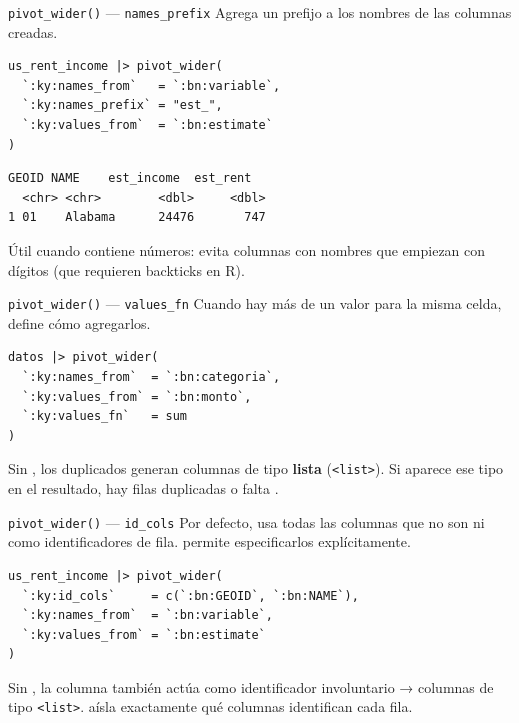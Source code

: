 \documentclass[8pt]{beamer}
\begin{document}
	\begin{frame}[fragile]{\texttt{pivot\_wider()} — \texttt{names\_prefix}}
		Agrega un prefijo a los nombres de las columnas creadas.

		\begin{lstlisting}[style=RScript]
us_rent_income |> pivot_wider(
  `:ky:names_from`   = `:bn:variable`,
  `:ky:names_prefix` = "est_",
  `:ky:values_from`  = `:bn:estimate`
)
\end{lstlisting}
		\begin{lstlisting}[style=RConsole]
  GEOID NAME    est_income  est_rent
  <chr> <chr>        <dbl>     <dbl>
1 01    Alabama      24476       747
\end{lstlisting}

		\begin{block}{}
			Útil cuando  contiene números: evita columnas con nombres que empiezan con dígitos (que requieren backticks en R).
		\end{block}
	\end{frame}

	\begin{frame}[fragile]{\texttt{pivot\_wider()} — \texttt{values\_fn}}
		Cuando hay más de un valor para la misma celda,  define cómo agregarlos.

		\begin{lstlisting}[style=RScript]
datos |> pivot_wider(
  `:ky:names_from`  = `:bn:categoria`,
  `:ky:values_from` = `:bn:monto`,
  `:ky:values_fn`   = sum
)
\end{lstlisting}

		\begin{alertblock}{}
			Sin , los duplicados generan columnas de tipo \textbf{lista} (\texttt{<list>}). Si aparece ese tipo en el resultado, hay filas duplicadas o falta .
		\end{alertblock}
	\end{frame}

	\begin{frame}[fragile]{\texttt{pivot\_wider()} — \texttt{id\_cols}}
		Por defecto,  usa todas las columnas que no son  ni  como identificadores de fila.  permite especificarlos explícitamente.

		\begin{lstlisting}[style=RScript]
us_rent_income |> pivot_wider(
  `:ky:id_cols`     = c(`:bn:GEOID`, `:bn:NAME`),
  `:ky:names_from`  = `:bn:variable`,
  `:ky:values_from` = `:bn:estimate`
)
\end{lstlisting}

		\begin{alertblock}{}
			Sin , la columna  también actúa como identificador involuntario → columnas de tipo \texttt{<list>}.  aísla exactamente qué columnas identifican cada fila.
		\end{alertblock}
	\end{frame}
\end{document}
